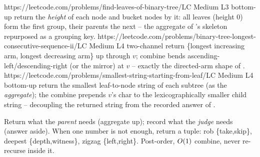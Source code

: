 \begin{practiceset}
    {https://leetcode.com/problems/find-leaves-of-binary-tree/}{LC Medium L3}
    {bottom-up return the \emph{height} of each node and bucket nodes by it: all
    leaves (height $0$) form the first group, their parents the next -- the
    aggregate of 's skeleton repurposed as a grouping key.}
    {https://leetcode.com/problems/binary-tree-longest-consecutive-sequence-ii/}{LC Medium L4}
    {two-channel return \{longest increasing arm, longest decreasing arm\} up
    through $v$; combine bends ascending-left/descending-right (or the mirror)
    at $v$ -- exactly the directed-arm shape of .}
    {https://leetcode.com/problems/smallest-string-starting-from-leaf/}{LC Medium L4}
    {bottom-up return the smallest leaf-to-node string of each subtree (as the
    \emph{aggregate}); the combine prepends $v$'s char to the lexicographically
    smaller child string -- decoupling the returned string from the recorded
    answer of .}
\end{practiceset}

\begin{recallbox}
Return what the \emph{parent} needs (aggregate up); record what the \emph{judge}
needs (answer aside). When one number is not enough, return a tuple: rob
\{take,skip\}, deepest \{depth,witness\}, zigzag \{left,right\}. Post-order,
$O(1)$ combine, never re-recurse inside it.
\end{recallbox}
